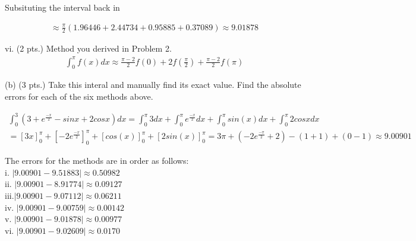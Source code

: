 \documentclass{article}
\begin{document}
Subsituting the interval back in

\begin{gather*}
  \approx \frac{\pi}{2} (1.96446 + 2.44734 + 0.95885 + 0.37089) \approx 9.01878
\end{gather*}


\noindent
vi. (2 pts.) Method you derived in Problem 2.
\begin{gather*}
  \int_{0}^{\pi}f(x)dx \approx \frac{\pi -2}{2}f(0) + 2f(\frac{\pi}{2}) + \frac{\pi - 2}{2}f(\pi)
\end{gather*}


\noindent
(b) (3 pts.) Take this interal and manually find its exact value. Find the absolute errors for each of the six methods above.

\begin{gather*}
  \int_{0}^{3}(3 + e^{\frac{-x}{2}} - sinx + 2cosx) dx
  = \int_{0}^{\pi} 3dx + \int_{0}^{\pi}e^{\frac{-x}{2}}dx + \int_{0}^{\pi}sin(x)dx + \int_{0}^{\pi}2cosxdx\\
  = [3x]^{\pi}_{0} + [-2e^{\frac{-x}{2}}]_{0}^{\pi} + [cos(x)]^{\pi}_{0} + [2sin(x)]^{\pi}_{0} = 3\pi + (-2e^{\frac{-\pi}{2}} + 2) - (1+1) + (0-1) \approx 9.00901
\end{gather*}

\noindent
The errors for the methods are in order as follows:\\
i.  $|9.00901 - 9.51883| \approx 0.50982$ \\
ii. $|9.00901 - 8.91774| \approx 0.09127$ \\
iii.$|9.00901 - 9.07112| \approx 0.06211$ \\
iv. $|9.00901 - 9.00759| \approx 0.00142$ \\
v. $|9.00901 - 9.01878| \approx 0.00977$ \\
vi. $|9.00901 - 9.02609| \approx 0.0170$
\end{document}
